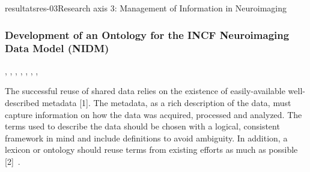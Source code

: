 \documentclass{ra2018}
\begin{document}
\begin{module}{resultats}{res-03}{Research axis 3: Management of Information in Neuroimaging}
\subsubsection{Development of an Ontology for the INCF Neuroimaging Data Model (NIDM)}
\begin{participants}
      , 
      , 
      , 
      , 
      ,
      , 
      ,
\end{participants}
The successful reuse of shared data relies on the existence of easily-available well-described metadata [1]. The metadata, as a rich description of the data, must capture information on how the data was acquired, processed and analyzed. The terms used to describe the data should be chosen with a logical, consistent framework in mind and include definitions to avoid ambiguity. In addition, a lexicon or ontology should reuse terms from existing efforts as much as possible [2]~\cite{helmer:inserm-01932994}.


\end{module}




\end{document}
